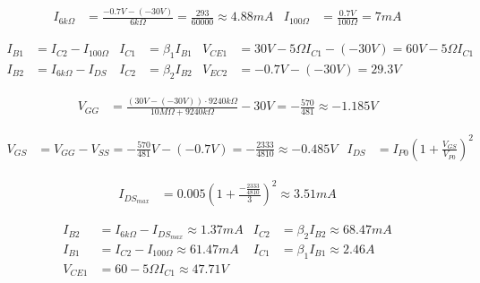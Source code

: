 %
%
%


\begin{align*}
  I_{6k\Omega} &= \frac{-0.7V - (-30V)}{6k\Omega}
  = \frac{293}{60000} \approx 4.88mA
  &
  I_{100\Omega} &= \frac{0.7V}{100\Omega} = 7mA
\end{align*}

\begin{align*}
  I_{B1} &= I_{C2} - I_{100\Omega}
  &
  I_{C1} &= \beta_{1} I_{B1}
  &
  V_{CE1} &= 30V - 5\Omega I_{C1} - (-30V) = 60V - 5\Omega I_{C1}
  \\
  I_{B2} &= I_{6k\Omega} - I_{DS}
  &
  I_{C2} &= \beta_{2} I_{B2}
  &
  V_{EC2} &= -0.7V - (-30V) = 29.3V
\end{align*}

\begin{align*}
  V_{GG}
  &= \frac{(30V - (-30V)) \cdot 9240k\Omega}{10M\Omega + 9240k\Omega} - 30V
  = - \frac{570}{481} \approx -1.185V
\end{align*}

\begin{align*}
  V_{GS} &= V_{GG} - V_{SS} = - \frac{570}{481} V - (-0.7 V) = - \frac{2333}{4810} \approx -0.485V
  &
  I_{DS} &= I_{P0} \left( 1 + \frac{V_{GS}}{V_{P0}} \right)^2
\end{align*}

\begin{align*}
  I_{DS_{max}} &= 0.005 \left( 1 + \frac{- \frac{2333}{4810}}{3} \right)^2 \approx 3.51mA
\end{align*}

\begin{align*}
  I_{B2} &= I_{6k\Omega} - I_{DS_{max}} \approx 1.37mA
  &
  I_{C2} &= \beta_2 I_{B2} \approx 68.47mA
  \\
  I_{B1} &= I_{C2} - I_{100\Omega} \approx 61.47mA
  &
  I_{C1} &= \beta_1 I_{B1} \approx 2.46A
  \\
  V_{CE1} &= 60 - 5\Omega I_{C1} \approx 47.71V
\end{align*}


